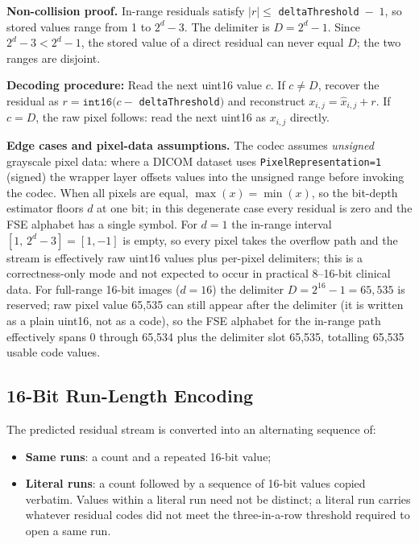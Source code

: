 \documentclass[journal]{IEEEtran}
\begin{document}
\textbf{Non-collision proof.} In-range residuals satisfy $|r| \leq$
\texttt{deltaThreshold}~$-$~$1$, so stored values range from 1 to $2^d - 3$.
The delimiter is $D = 2^d - 1$. Since $2^d - 3 < 2^d - 1$, the stored value of
a direct residual can never equal $D$; the two ranges are disjoint.

\textbf{Decoding procedure:} Read the next uint16 value $c$.
If $c \neq D$, recover the residual as $r = \texttt{int16}(c -$
\texttt{deltaThreshold}$)$ and reconstruct $x_{i,j} = \hat{x}_{i,j} + r$.
If $c = D$, the raw pixel follows: read the next uint16 as $x_{i,j}$ directly.

\textbf{Edge cases and pixel-data assumptions.} The codec assumes
\emph{unsigned} grayscale pixel data: where a DICOM dataset uses
\texttt{PixelRepresentation=1} (signed) the wrapper layer offsets values
into the unsigned range before invoking the codec. When all pixels are
equal, $\max(x)=\min(x)$, so the bit-depth estimator floors $d$ at one
bit; in this degenerate case every residual is zero and the FSE alphabet
has a single symbol. For $d=1$ the in-range interval $[1,\,2^d-3]=[1,-1]$
is empty, so every pixel takes the overflow path and the stream is
effectively raw uint16 values plus per-pixel delimiters; this is a
correctness-only mode and not expected to occur in practical 8--16-bit
clinical data. For full-range 16-bit images ($d=16$) the delimiter
$D=2^{16}-1=65{,}535$ is reserved; raw pixel value 65{,}535 can still
appear after the delimiter (it is written as a plain uint16, not as a
code), so the FSE alphabet for the in-range path effectively spans 0
through 65{,}534 plus the delimiter slot 65{,}535, totalling 65{,}535
usable code values.

\subsection{16-Bit Run-Length Encoding}

The predicted residual stream is converted into an alternating sequence of:
\begin{itemize}
  \item \textbf{Same runs}: a count and a repeated 16-bit value;
  \item \textbf{Literal runs}: a count followed by a sequence of 16-bit
  values copied verbatim. Values within a literal run need not be distinct;
  a literal run carries whatever residual codes did not meet the
  three-in-a-row threshold required to open a same run.
\end{itemize}
\end{document}
